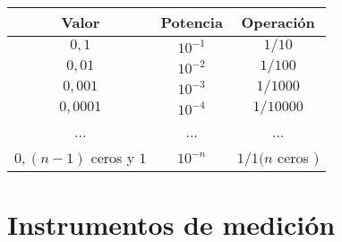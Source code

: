 \begin{tabular}{|c|c|c|}
\hline 
Valor & Potencia & Operación \\ 
\hline 
$0,1$ & $10^{-1}$ & $1/10$ \\ 
\hline 
$0,01$ & $10^{-2}$ & $1/100$ \\ 
\hline 
$0,001$ & $10^{-3}$ & $1/1000$ \\ 
\hline 
$0,0001$ & $10^{-4}$ & $1/10000$ \\ 
\hline 
... & ... & ... \\ 
\hline 
$0,(n-1)$ ceros y $1$ & $10^{-n}$ & $1/1(n$ ceros $)$ \\ 
\hline 
\end{tabular}
\section{Instrumentos de medición}

